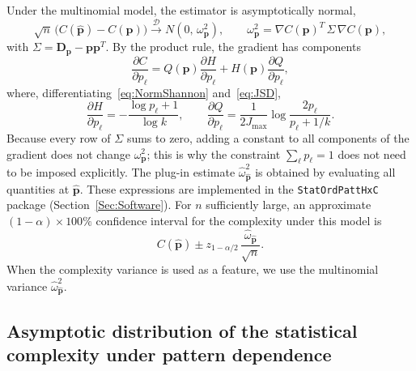Under the multinomial model, the estimator is asymptotically normal,
\begin{equation}
	\sqrt{n}\,\big(C(\widehat{\mathbf{p}})-C(\mathbf{p})\big)\xrightarrow{\mathscr{D}}N\!\left(0,\,\omega^2_{\mathbf{p}}\right),
	\qquad
	\omega^2_{\mathbf{p}}=\nabla C(\mathbf{p})^{T}\,\Sigma\,\nabla C(\mathbf{p}),
	\label{eq:OmegaMultinomial}
\end{equation}
with $\Sigma=\mathbf{D_p}-\mathbf{p}\mathbf{p}^{T}$. By the product rule, the gradient has components
\[
\frac{\partial C}{\partial p_\ell}=Q(\mathbf{p})\frac{\partial H}{\partial p_\ell}+H(\mathbf{p})\frac{\partial Q}{\partial p_\ell},
\]
where, differentiating~\eqref{eq:NormShannon} and~\eqref{eq:JSD},
\[
\frac{\partial H}{\partial p_\ell}=-\frac{\log p_\ell+1}{\log k},
\qquad
\frac{\partial Q}{\partial p_\ell}=\frac{1}{2J_{\max}}\log\frac{2p_\ell}{p_\ell+1/k}.
\]
Because every row of $\Sigma$ sums to zero, adding a constant to all components of the gradient does not change $\omega^2_{\mathbf{p}}$; this is why the constraint $\sum_\ell p_\ell=1$ does not need to be imposed explicitly. The plug-in estimate $\widehat{\omega}^2_{\widehat{\mathbf{p}}}$ is obtained by evaluating all quantities at $\widehat{\mathbf{p}}$. These expressions are implemented in the \texttt{StatOrdPattHxC} package (Section~\ref{Sec:Software}). For $n$ sufficiently large, an approximate $(1-\alpha)\times100\%$ confidence interval for the complexity under this model is
\begin{equation}
	C(\widehat{\mathbf{p}})\pm z_{1-\alpha/2}\,\frac{\widehat{\omega}_{\widehat{\mathbf{p}}}}{\sqrt{n}}.
	\label{eq:CIComplexityMultinomial}
\end{equation}
When the complexity variance is used as a feature, we use the multinomial variance $\widehat{\omega}^2_{\widehat{\mathbf{p}}}$.

\subsection{Asymptotic distribution of the statistical complexity under pattern dependence}\label{Subsec:AsympVarComplexityDependence}

